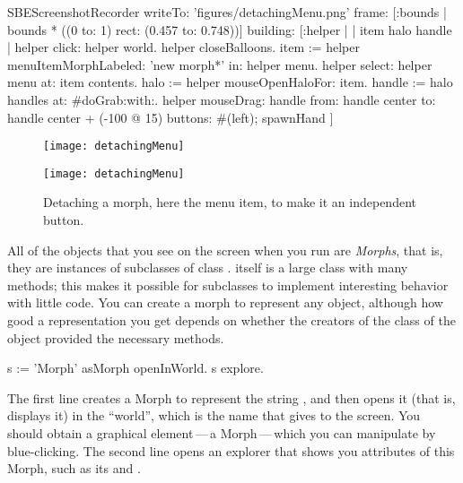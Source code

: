 \documentclass[a4paper,10pt,twoside]{book}
\begin{document}

\begin{ExecuteSmalltalkScript}
SBEScreenshotRecorder writeTo: 'figures/detachingMenu.png' frame: [:bounds | bounds * ((0 to: 1) rect: (0.457 to: 0.748))] building: [:helper |
	| item halo handle |
	helper click: helper world.
	helper closeBalloons.
	item := helper menuItemMorphLabeled: 'new morph*' in: helper menu.
	helper select: helper menu at: item contents.
	halo := helper mouseOpenHaloFor: item.
	handle := halo handles at: #doGrab:with:.
	helper
		mouseDrag: handle
			from: handle center
			to: handle center + (-100 @ 15)
			buttons: #(left);
		spawnHand
]
\end{ExecuteSmalltalkScript}
\begin{figure}[ht]
	\ifluluelse
		{\centerline{\texttt{[image: detachingMenu]}}}
		{\centerline{\texttt{[image: detachingMenu]}}}
	\caption{Detaching a morph, here the  menu item, to make it an independent button.
		\label{fig:detachingMenu}}
\end{figure}

All of the objects that you see on the screen when you run \sq are \emph{Morphs}, that is, they are instances of subclasses of class .
\mbox{} itself is a large class with many methods; this makes it possible for subclasses to implement interesting behavior with little code.
You can create a morph to represent any object, although how good a representation you get depends on whether the creators of the class of the object provided the necessary methods.

\begin{code}{}
s := 'Morph' asMorph openInWorld.
s explore.
\end{code}

The first line creates a Morph to represent the string , and then opens it (that is, displays it) in the ``world'', which is the name that \sq gives to the screen.
You should obtain a graphical element\,---\,a Morph\,---\,which you can manipulate by blue-clicking.
The second line opens an explorer that shows you attributes of this Morph, such as its  and .
\end{document}

